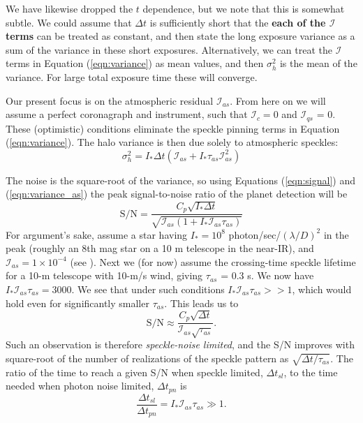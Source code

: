 \documentclass[10pt,preprint]{aastex631}
\begin{document}
We have likewise dropped the $t$ dependence, but we note that this is somewhat subtle.  We could assume that $\Delta t$ is sufficiently short that the \textbf{each of the $\mathcal{I}$ terms} can be treated as constant, and then state the long exposure variance as a sum of the variance in these short exposures.  Alternatively, we can treat the $\mathcal{I}$ terms in Equation (\ref{eqn:variance}) as mean values, and then $\sigma^2_{h}$ is the mean of the variance.  For large total exposure time these will converge.

Our present focus is on the atmospheric residual $\mathcal{I}_{as}$.  From here on we will assume a perfect coronagraph and instrument, such that $\mathcal{I}_c = 0$ and $\mathcal{I}_{qs}$ = 0.  These (optimistic) conditions eliminate the speckle pinning \citep{2001ApJ...558L..71B} terms in Equation (\ref{eqn:variance}).  The halo variance is then due solely to atmospheric speckles:
\begin{equation}
\sigma^2_{h}  = I_* \Delta t \left(\mathcal{I}_{as} + I_* \tau_{as} \mathcal{I}_{as}^2 \right)
\label{eqn:variance_as}
\end{equation}

The noise is the square-root of the variance, so using Equations (\ref{eqn:signal}) and  (\ref{eqn:variance_as}) the peak signal-to-noise ratio of the planet detection will be
\begin{equation}
\mbox{S/N} = \frac{C_p \sqrt{I_* \Delta t}}{ \sqrt{\mathcal{I}_{as} (1 + I_*\mathcal{I}_{as} \tau_{as})}} 
\end{equation}
For argument's sake, assume a star having $I_* = 10^8$ photon/sec/$(\lambda/D)^2$ in the peak (roughly an 8th mag star on a 10 m telescope in the near-IR), and $\mathcal{I}_{as} = 1\times10^{-4}$ (see \citealt{2018JATIS...4a9001M}).  Next we (for now) assume the \citet{2005SPIE.5903..170M} crossing-time speckle lifetime for a 10-m telescope with 10-m/s wind, giving $\tau_{as}$ = 0.3 s.  We now have $I_*\mathcal{I}_{as} \tau_{as} = 3000$.  We see that under such conditions  $I_*\mathcal{I}_{as} \tau_{as} >> 1$, which would hold even for significantly smaller $\tau_{as}$.  This leads us to
\begin{equation}
\mbox{S/N} \approx \frac{C_p \sqrt{\Delta t}}{ \mathcal{I}_{as} \sqrt{\tau_{as}}}. 
\end{equation}
Such an observation is therefore \emph{speckle-noise limited}, and the S/N improves with square-root of the number of realizations of the speckle pattern as $\sqrt{\Delta t/ \tau_{as}}$.  The ratio of the time to reach a given S/N when speckle limited, $\Delta t_{sl}$, to the time needed when photon noise limited, $\Delta t_{pn}$ is
\begin{equation}
\frac{\Delta t_{sl}}{\Delta t_{pn}} = I_*\mathcal{I}_{as} \tau_{as} \gg 1.
\label{eqn:relexptime}
\end{equation}
\end{document}
